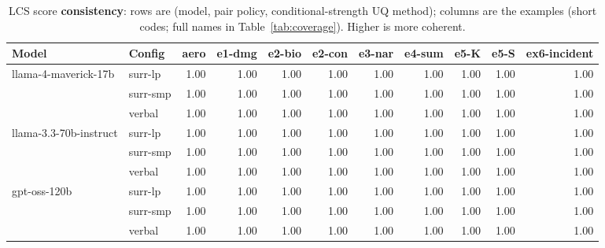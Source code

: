 \documentclass[11pt]{article}
\begin{document}
\begin{table}[htbp]
\centering
\footnotesize
\setlength{\tabcolsep}{3.5pt}
\caption{LCS score \textbf{consistency}: rows are (model, pair policy, conditional-strength UQ method); columns are the examples (short codes; full names in Table~\ref{tab:coverage}). Higher is more coherent.}
\label{tab:consistency}
\begin{tabular}{llrrrrrrrrr}
\toprule
\textbf{Model} & \textbf{Config} & \textbf{aero} & \textbf{e1-dmg} & \textbf{e2-bio} & \textbf{e2-con} & \textbf{e3-nar} & \textbf{e4-sum} & \textbf{e5-K} & \textbf{e5-S} & \textbf{ex6-incident} \\
\midrule
llama-4-maverick-17b & surr-lp & 1.00 & 1.00 & 1.00 & 1.00 & 1.00 & 1.00 & 1.00 & 1.00 & 1.00 \\
 & surr-smp & 1.00 & 1.00 & 1.00 & 1.00 & 1.00 & 1.00 & 1.00 & 1.00 & 1.00 \\
 & verbal & 1.00 & 1.00 & 1.00 & 1.00 & 1.00 & 1.00 & 1.00 & 1.00 & 1.00 \\
\midrule
llama-3.3-70b-instruct & surr-lp & 1.00 & 1.00 & 1.00 & 1.00 & 1.00 & 1.00 & 1.00 & 1.00 & 1.00 \\
 & surr-smp & 1.00 & 1.00 & 1.00 & 1.00 & 1.00 & 1.00 & 1.00 & 1.00 & 1.00 \\
 & verbal & 1.00 & 1.00 & 1.00 & 1.00 & 1.00 & 1.00 & 1.00 & 1.00 & 1.00 \\
\midrule
gpt-oss-120b & surr-lp & 1.00 & 1.00 & 1.00 & 1.00 & 1.00 & 1.00 & 1.00 & 1.00 & 1.00 \\
 & surr-smp & 1.00 & 1.00 & 1.00 & 1.00 & 1.00 & 1.00 & 1.00 & 1.00 & 1.00 \\
 & verbal & 1.00 & 1.00 & 1.00 & 1.00 & 1.00 & 1.00 & 1.00 & 1.00 & 1.00 \\
\bottomrule
\end{tabular}
\end{table}
\end{document}
